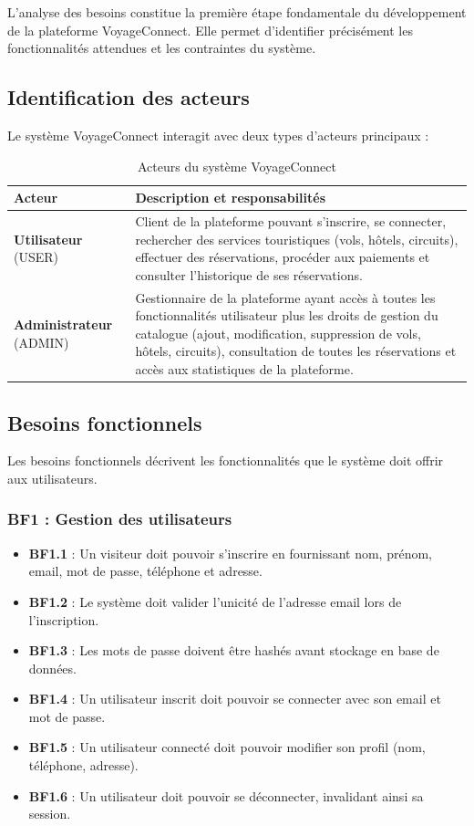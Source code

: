 \documentclass[12pt,a4paper]{report}
\begin{document}
L'analyse des besoins constitue la première étape fondamentale du développement de la plateforme VoyageConnect. Elle permet d'identifier précisément les fonctionnalités attendues et les contraintes du système.

\subsection{Identification des acteurs}

Le système VoyageConnect interagit avec deux types d'acteurs principaux :

\begin{table}[H]
\centering
\caption{Acteurs du système VoyageConnect}
\label{tab:acteurs}
\begin{tabular}{|l|p{10cm}|}
\hline
\textbf{Acteur} & \textbf{Description et responsabilités} \\
\hline
\textbf{Utilisateur} (USER) & Client de la plateforme pouvant s'inscrire, se connecter, rechercher des services touristiques (vols, hôtels, circuits), effectuer des réservations, procéder aux paiements et consulter l'historique de ses réservations. \\
\hline
\textbf{Administrateur} (ADMIN) & Gestionnaire de la plateforme ayant accès à toutes les fonctionnalités utilisateur plus les droits de gestion du catalogue (ajout, modification, suppression de vols, hôtels, circuits), consultation de toutes les réservations et accès aux statistiques de la plateforme. \\
\hline
\end{tabular}
\end{table}

\subsection{Besoins fonctionnels}

Les besoins fonctionnels décrivent les fonctionnalités que le système doit offrir aux utilisateurs.

\subsubsection{BF1 : Gestion des utilisateurs}

\begin{itemize}
    \item \textbf{BF1.1} : Un visiteur doit pouvoir s'inscrire en fournissant nom, prénom, email, mot de passe, téléphone et adresse.
    \item \textbf{BF1.2} : Le système doit valider l'unicité de l'adresse email lors de l'inscription.
    \item \textbf{BF1.3} : Les mots de passe doivent être hashés avant stockage en base de données.
    \item \textbf{BF1.4} : Un utilisateur inscrit doit pouvoir se connecter avec son email et mot de passe.
    \item \textbf{BF1.5} : Un utilisateur connecté doit pouvoir modifier son profil (nom, téléphone, adresse).
    \item \textbf{BF1.6} : Un utilisateur doit pouvoir se déconnecter, invalidant ainsi sa session.
\end{itemize}
\end{document}
